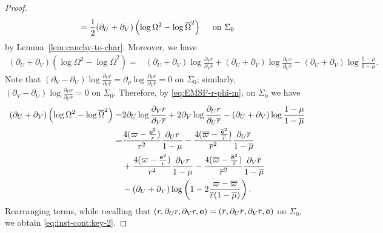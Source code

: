 \documentclass[10pt, reqno]{amsart}
\theoremstyle{definition}
\theoremstyle{remark}
\theoremstyle{conjecture}
\numberwithin{equation}{section}
\newcommand{\rd}{\partial}
\newcommand{\0}{\emptyset}
\newcommand{\Sgm}{\Sigma}
\newcommand{\Omg}{\Omega}
\newcommand{\bfe}{{\bf e}}
\newcommand{\e}{\bfe}							%
\newcommand{\Omgbg}{\overline{\Omg}}				%
\newcommand{\rbg}{\overline{r}}					%
\newcommand{\varpibg}{\overline{\varpi}}				%
\newcommand{\mubg}{\overline{\mu}}				%
\newcommand{\ebg}{\overline{\e}}					%
\begin{document}
\begin{proof}
\begin{equation*}
	= \frac{1}{2} (\rd_{U} + \rd_{V}) \left(\log \Omg^{2} - \log \Omgbg^{2} \right) \quad \hbox{ on } \Sgm_{0}
\end{equation*}
 by Lemma~\ref{lem:cauchy-to-char}. Moreover, we have
 \begin{align*}
(\rd_{U} + \rd_{V}) \left(\log \Omg^{2} - \log \Omgbg^{2} \right)
= & (\rd_{U} + \rd_{V}) \log \frac{\rd_{V} r}{\rd_{V} \rbg} + (\rd_{U} + \rd_{V}) \log \frac{\rd_{U} r}{\rd_{U} \rbg}
- (\rd_{U} + \rd_{V}) \log \frac{1-\mu}{1-\mubg}.
\end{align*}
Note that $(\rd_{V} - \rd_{U}) \log \frac{\rd_{V} r}{\rd_{V} \rbg} = \rd_{\rho} \log \frac{\rd_{V} r}{\rd_{V} \rbg} = 0$ on $\Sgm_{0}$; similarly, $(\rd_{V} - \rd_{U}) \log \frac{\rd_{U} r}{\rd_{U} \rbg} = 0$ on $\Sgm_{0}$. Therefore, by \eqref{eq:EMSF-r-phi-m}, on $\Sgm_{0}$ we have
\begin{align*}
(\rd_{U} + \rd_{V}) \left(\log \Omg^{2} - \log \Omgbg^{2} \right)
= & 2 \rd_{U} \log \frac{\rd_{V} r}{\rd_{V} \rbg} + 2 \rd_{V} \log \frac{\rd_{U} r}{\rd_{U} \rbg} - (\rd_{U} + \rd_{V}) \log \frac{1-\mu}{1-\mubg} \\
= & \frac{4 (\varpi - \frac{\e^{2}}{r})}{r^{2}} \frac{\rd_{U} r}{1-\mu} - \frac{4 (\varpibg - \frac{\ebg^{2}}{\rbg})}{\rbg^{2}} \frac{\rd_{U} \rbg}{1-\mubg} \\
& + \frac{4 (\varpi - \frac{\e^{2}}{r})}{r^{2}} \frac{\rd_{V} r}{1-\mu} - \frac{4 (\varpibg - \frac{\ebg^{2}}{\rbg})}{\rbg^{2}} \frac{\rd_{V} \rbg}{1-\mubg} \\
& - (\rd_{U} + \rd_{V}) \log \left(1 - 2 \frac{\varpi - \varpibg}{\rbg (1-\mubg)}\right).
\end{align*}
Rearranging terms, while recalling that $(r, \rd_{U} r, \rd_{V} r, \e) = (\rbg, \rd_{U} \rbg, \rd_{V} \rbg, \ebg)$ on $\Sgm_{0}$, we obtain \eqref{eq:inst-cont:key-2}. 


\end{proof}
\end{document}
